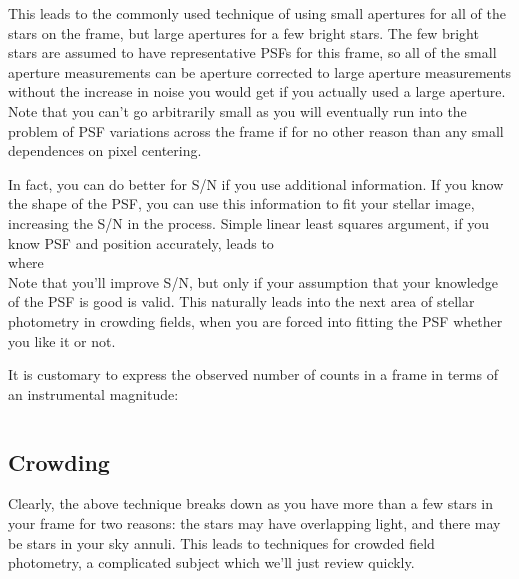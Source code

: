 \documentclass[12pt]{article}
\begin{document}
This leads to the commonly used technique of using small apertures for
all of the stars on the frame, but large apertures for a few bright
stars. The few bright stars are assumed to have representative PSFs
for this frame, so all of the small aperture measurements can be
aperture corrected to large aperture measurements without the increase
in noise you would get if you actually used a large aperture. Note
that you can't go arbitrarily small as you will eventually run into
the problem of PSF variations across the frame if for no other reason
than any small dependences on pixel centering.

In fact, you can do better for S/N if you use additional information.
If you know the shape of the PSF, you can use this information to fit
your stellar image, increasing the S/N in the process. Simple linear
least squares argument, if you know PSF and position accurately, leads
to
\[
    \]
where
\[
    \]
Note that you'll improve S/N, but only if your assumption that your
knowledge of the PSF is good is valid. This naturally leads into the
next area of stellar photometry in crowding fields, when you are
forced into fitting the PSF whether you like it or not.


It is customary to express the observed number of counts in a frame in
terms of an instrumental magnitude:

\[
    \]
\subsection{Crowding}
Clearly, the above technique breaks down as you have more than a few
stars in your frame for two reasons: the stars may have overlapping
light, and there may be stars in your sky annuli. This leads to
techniques for crowded field photometry, a complicated subject which
we'll just review quickly.
\end{document}
